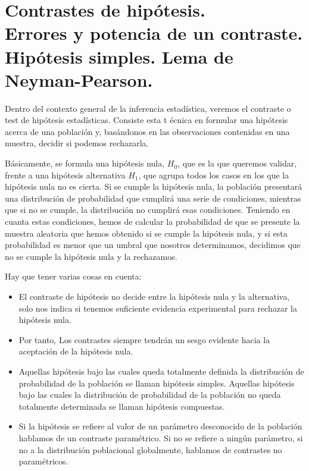 \chapter[Contrastes de hip\'otesis.]{Contrastes de hip\'otesis. \\
\normalsize Errores y potencia de un contraste. Hip\'otesis simples. Lema de Neyman-Pearson.}


Dentro del contexto general de la inferencia estad\'istica, veremos el contraste o test de hip\'otesis estad\'isticas. Consiste esta t \'ecnica en formular una hip\'otesis acerca de una poblaci\'on y, bas\'andonos en las observaciones contenidas en una muestra, decidir si podemos rechazarla.

B\'asicamente, se formula una hip\'otesis nula, $H_0$, que es la que queremos validar, frente a una hip\'otesis alternativa $H_1$, que agrupa todos los casos en los que la hip\'otesis nula no es cierta. Si se cumple la hip\'otesis nula, la poblaci\'on presentar\'a una distribuci\'on de probabilidad que cumplir\'a una serie de condiciones, mientras que si no se cumple, la distribuci\'on no cumplir\'a esas condiciones. Teniendo en cuanta estas condiciones, hemos de calcular la probabilidad de que se presente la muestra aleatoria que hemos obtenido si se cumple la hip\'otesis nula, y si esta probabilidad es menor que un umbral que nosotros determinamos, decidimos que no se cumple la hip\'otesis nula y la rechazamos.

Hay que tener varias cosas en cuenta:
\begin{itemize}
\item El contraste de hip\'otesis no decide entre la hip\'otesis nula y la alternativa, solo nos indica si tenemos suficiente evidencia experimental para rechazar la hip\'otesis nula.
\item Por tanto, Los contrastes siempre tendr\'an un sesgo evidente hacia la aceptaci\'on de la hip\'otesis nula.
\item Aquellas hip\'otesis bajo las cuales queda totalmente definida la distribuci\'on de probabilidad de la poblaci\'on se llaman hip\'otesis simples. Aquellas hip\'otesis bajo las cuales la distribuci\'on de probabilidad de la poblaci\'on no queda totalmente determinada se llaman hip\'otesis compuestas.
\item Si la hip\'otesis se refiere al valor de un par\'ametro desconocido de la poblaci\'on hablamos de un contraste param\'etrico. Si no se refiere a ning\'un par\'ametro, si no a la distribuci\'on poblacional globalmente, hablamos de contrastes no param\'etricos.
\end{itemize}

